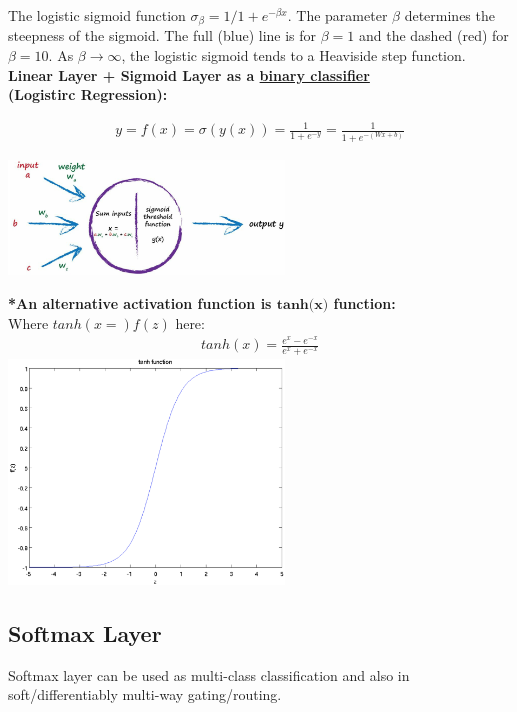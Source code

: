 The logistic sigmoid function $\sigma_\beta=1/1+e^{-\beta x} $. The parameter $ \beta $ determines the steepness of the sigmoid. The full (blue) line is for $ \beta=1 $ and the dashed (red) for $ \beta=10 $. As $ \beta \rightarrow \infty $, the logistic sigmoid tends to a Heaviside step function. \\


\textbf{Linear Layer + Sigmoid Layer as a \underline{binary classifier}\\ (Logistirc Regression):}

\begin{align}
	y = f(x) = \sigma(y(x)) = \frac{1}{1+e^{-y}}= \frac{1}{1+e^{-(Wx+b)}}
\end{align}

\begin{center}
	\includegraphics[width=0.55\textwidth]{figures/sigmoid02}
\end{center} 

\textbf{*An alternative activation function is $ \textbf{tanh(x)} $ function:}\\
\vspace{5 pt}
Where $ tanh(x=)f(z) $ here:
\begin{align}
tanh(x)=\frac{e^x-e^{-x}}{e^x+e^{-x}}
\end{align}
\vspace{10pt}
\includegraphics[width=0.55\textwidth]{figures/tanh}

\subsection{Softmax Layer}
Softmax layer can be used as multi-class classification and also in soft/differentiably multi-way gating/routing.

